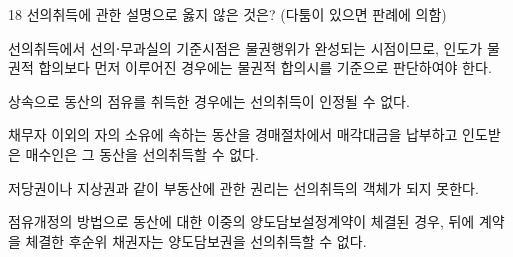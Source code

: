 \begin{question}{18}
선의취득에 관한 설명으로 옳지 않은 것은? (다툼이 있으면 판례에 의함)
\begin{choices}
  \item 선의취득에서 선의⋅무과실의 기준시점은 물권행위가 완성되는 시점이므로, 인도가 물권적 합의보다 먼저 이루어진 경우에는 물권적 합의시를 기준으로 판단하여야 한다.
  \item 상속으로 동산의 점유를 취득한 경우에는 선의취득이 인정될 수 없다.
  \item 채무자 이외의 자의 소유에 속하는 동산을 경매절차에서 매각대금을 납부하고 인도받은 매수인은 그 동산을 선의취득할 수 없다.
  \item 저당권이나 지상권과 같이 부동산에 관한 권리는 선의취득의 객체가 되지 못한다.
  \item 점유개정의 방법으로 동산에 대한 이중의 양도담보설정계약이 체결된 경우, 뒤에 계약을 체결한 후순위 채권자는 양도담보권을 선의취득할 수 없다.
\end{choices}
\end{question}
